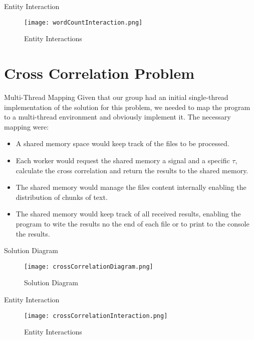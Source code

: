 \documentclass{beamer}
\begin{document}

\begin{frame}{Entity Interaction}
	\begin{figure}
		\texttt{[image: wordCountInteraction.png]}
		\caption{Entity Interactions}
		\label{wordInteraction}
	\end{figure}
\end{frame}


\section{Cross Correlation Problem}


\begin{frame}{Multi-Thread Mapping}
	Given that our group had an initial single-thread implementation of the solution for this problem, we needed to map the program to a multi-thread environment and obviously implement it. The necessary mapping were:
	\begin{itemize}
		\item A shared memory space would keep track of the files to be processed.
		\item Each worker would request the shared memory a signal and a specific $\tau$, calculate the cross correlation and return the results to the shared memory.
		\item The shared memory would manage the files content internally enabling the distribution of chunks of text.
		\item The shared memory would keep track of all received results, enabling the program to wite the results no the end of each file or to print to the console the results.
	\end{itemize}
\end{frame}


\begin{frame}{Solution Diagram}
	\begin{figure}
		\texttt{[image: crossCorrelationDiagram.png]}
		\caption{Solution Diagram}
		\label{crossDiagram}
	\end{figure}
\end{frame}


\begin{frame}{Entity Interaction}
	\begin{figure}
		\texttt{[image: crossCorrelationInteraction.png]}
		\caption{Entity Interactions}
		\label{crossInteraction}
	\end{figure}
\end{frame}
\end{document}
